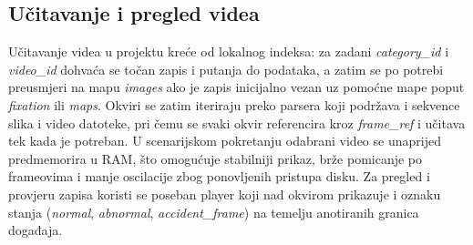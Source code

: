 \subsection{Učitavanje i pregled videa}
Učitavanje videa u projektu kreće od lokalnog indeksa: za zadani \textit{category\_id} i \textit{video\_id} dohvaća se točan zapis i putanja do podataka, a zatim se po potrebi preusmjeri na mapu \textit{images} ako je zapis inicijalno vezan uz pomoćne mape poput \textit{fixation} ili \textit{maps}. Okviri se zatim iteriraju preko parsera koji podržava i sekvence slika i video datoteke, pri čemu se svaki okvir referencira kroz \textit{frame\_ref} i učitava tek kada je potreban. U scenarijskom pokretanju odabrani video se unaprijed predmemorira u RAM, što omogućuje stabilniji prikaz, brže pomicanje po frameovima i manje oscilacije zbog ponovljenih pristupa disku. Za pregled i provjeru zapisa koristi se poseban player koji nad okvirom prikazuje i oznaku stanja (\textit{normal}, \textit{abnormal}, \textit{accident\_frame}) na temelju anotiranih granica događaja.
